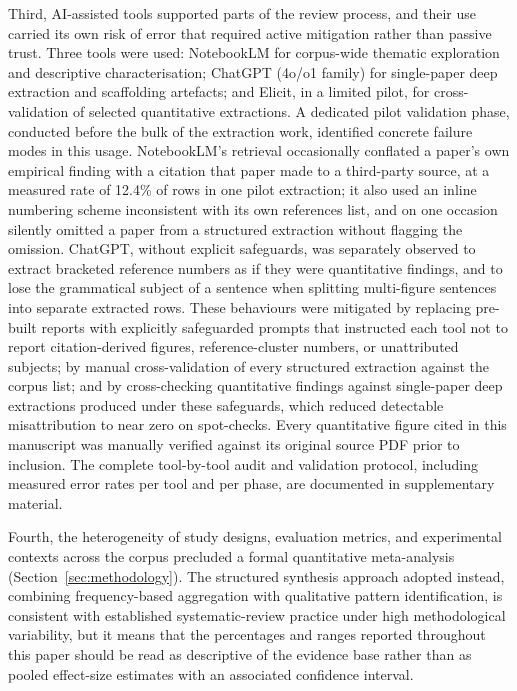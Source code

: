 Third, AI-assisted tools supported parts of the review process, and their use carried its own risk of error that required active mitigation rather than passive trust. Three tools were used: NotebookLM for corpus-wide thematic exploration and descriptive characterisation; ChatGPT (4o/o1 family) for single-paper deep extraction and scaffolding artefacts; and Elicit, in a limited pilot, for cross-validation of selected quantitative extractions. A dedicated pilot validation phase, conducted before the bulk of the extraction work, identified concrete failure modes in this usage. NotebookLM's retrieval occasionally conflated a paper's own empirical finding with a citation that paper made to a third-party source, at a measured rate of 12.4\% of rows in one pilot extraction; it also used an inline numbering scheme inconsistent with its own references list, and on one occasion silently omitted a paper from a structured extraction without flagging the omission. ChatGPT, without explicit safeguards, was separately observed to extract bracketed reference numbers as if they were quantitative findings, and to lose the grammatical subject of a sentence when splitting multi-figure sentences into separate extracted rows. These behaviours were mitigated by replacing pre-built reports with explicitly safeguarded prompts that instructed each tool not to report citation-derived figures, reference-cluster numbers, or unattributed subjects; by manual cross-validation of every structured extraction against the corpus list; and by cross-checking quantitative findings against single-paper deep extractions produced under these safeguards, which reduced detectable misattribution to near zero on spot-checks. Every quantitative figure cited in this manuscript was manually verified against its original source PDF prior to inclusion. The complete tool-by-tool audit and validation protocol, including measured error rates per tool and per phase, are documented in supplementary material.

Fourth, the heterogeneity of study designs, evaluation metrics, and experimental contexts across the corpus precluded a formal quantitative meta-analysis (Section~\ref{sec:methodology}). The structured synthesis approach adopted instead, combining frequency-based aggregation with qualitative pattern identification, is consistent with established systematic-review practice under high methodological variability, but it means that the percentages and ranges reported throughout this paper should be read as descriptive of the evidence base rather than as pooled effect-size estimates with an associated confidence interval.

